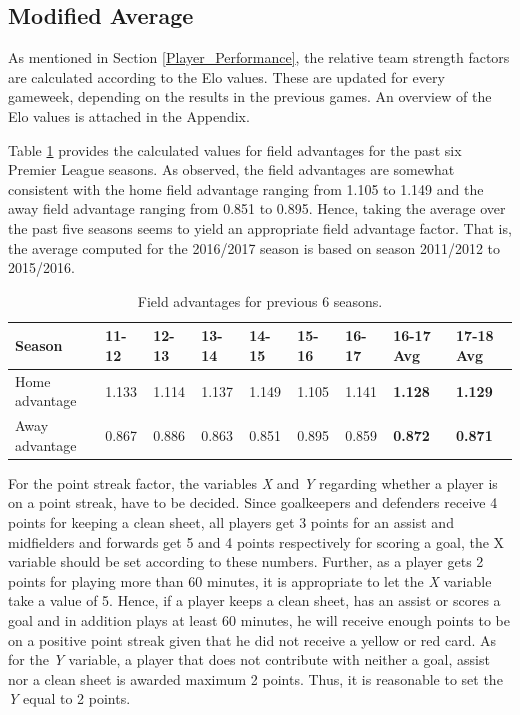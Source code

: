 \subsection{Modified Average}
As mentioned in Section \ref{Player_Performance}, the relative team strength factors are calculated according to the Elo values. These are updated for every gameweek, depending on the results in the previous games. An overview of the Elo values is attached in the Appendix. 

\newpar

Table \ref{Field advantage} provides the calculated values for field advantages for the past six Premier League seasons. As observed, the field advantages are somewhat consistent with the home field advantage ranging from 1.105 to 1.149 and the away field advantage ranging from 0.851 to 0.895. Hence, taking the average over the past five seasons seems to yield an appropriate field advantage factor. That is, the average computed for the 2016/2017 season is based on season 2011/2012 to 2015/2016.

\begin{table}[H]
\centering
\smaller
\begin{tabular}{|l|l|l|l|l|l|l|l|l|}
\hline
Season & 11-12    & 12-13   & 13-14    & 14-15    & 15-16 & 16-17 & 16-17 Avg & 17-18 Avg \\ 
\hline
Home advantage & 1.133 & 1.114 & 1.137 & 1.149 & 1.105 & 1.141 & \textbf{1.128} & \textbf{1.129}\\
\hline
Away advantage & 0.867 & 0.886 & 0.863 & 0.851 & 0.895 & 0.859 & \textbf{0.872} & \textbf{0.871}\\
\hline
\end{tabular}
\caption{Field advantages for previous 6 seasons.}
\label{Field advantage}
\end{table}

For the point streak factor, the variables \textit{X} and \textit{Y} regarding whether a player is on a point streak, have to be decided. Since goalkeepers and defenders receive 4 points for keeping a clean sheet, all players get 3 points for an assist and midfielders and forwards get 5 and 4 points respectively for scoring a goal, the X variable should be set according to these numbers. Further, as a player gets 2 points for playing more than 60 minutes, it is appropriate to let the \textit{X} variable take a value of 5. Hence, if a player keeps a clean sheet, has an assist or scores a goal and in addition plays at least 60 minutes, he will receive enough points to be on a positive point streak given that he did not receive a yellow or red card. As for the \textit{Y} variable, a player that does not contribute with neither a goal, assist nor a clean sheet is awarded maximum 2 points. Thus, it is reasonable to set the \textit{Y} equal to 2 points. 


